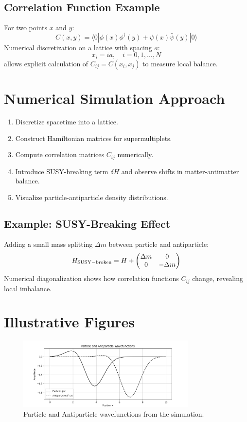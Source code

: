 \documentclass[12pt,a4paper]{article}
\begin{document}
\subsection{Correlation Function Example}
For two points \(x\) and \(y\):
\[
C(x,y) = \langle 0 | \phi(x) \phi^\dagger(y) + \psi(x) \bar\psi(y) | 0 \rangle
\]
Numerical discretization on a lattice with spacing \(a\):
\[
x_i = i a, \quad i=0,1,\dots,N
\]
allows explicit calculation of \(C_{ij} = C(x_i,x_j)\) to measure local balance.

\section{Numerical Simulation Approach}
\begin{enumerate}
    \item Discretize spacetime into a lattice.  
    \item Construct Hamiltonian matrices for supermultiplets.  
    \item Compute correlation matrices \(C_{ij}\) numerically.  
    \item Introduce SUSY-breaking term \(\delta H\) and observe shifts in matter-antimatter balance.  
    \item Visualize particle-antiparticle density distributions.
\end{enumerate}

\subsection{Example: SUSY-Breaking Effect}
Adding a small mass splitting \(\Delta m\) between particle and antiparticle:
\[
H_{\rm SUSY-broken} = H + \begin{pmatrix} \Delta m & 0 \\ 0 & -\Delta m \end{pmatrix}
\]
Numerical diagonalization shows how correlation functions \(C_{ij}\) change, revealing local imbalance.

\section{Illustrative Figures}

\begin{figure}[H]
\centering
\includegraphics[width=0.8\textwidth]{wavefunctions.png} %
\caption{Particle and Antiparticle wavefunctions from the simulation.}
\label{fig:wavefunctions}
\end{figure}
\end{document}
